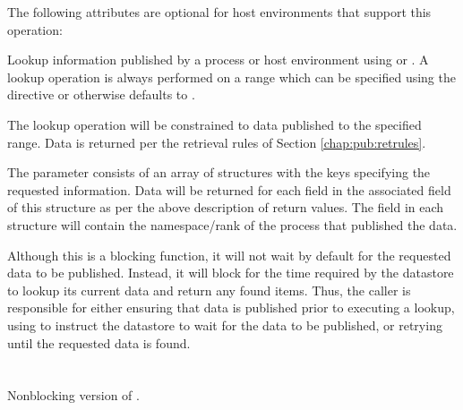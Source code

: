 \reqattrend

\optattrstart
The following attributes are optional for host environments that support this operation:


\optattrend

\descr

Lookup information published by a process or host environment using  or .
A lookup operation is always performed on a range which can be specified using the directive  or otherwise defaults to .

The lookup operation will be constrained to data published to the specified range.
Data is returned per the retrieval rules of Section \ref{chap:pub:retrules}.

The  parameter consists of an array of  structures with the keys specifying the requested information.
Data will be returned for each  field in the associated  field of this structure as per the above description of return values. The  field in each  structure will contain the namespace/rank of the process that published the data.

\adviceuserstart
Although this is a blocking function, it will not wait by default for the requested data to be published.
Instead, it will block for the time required by the datastore to lookup its current data and return any found items.
Thus, the caller is responsible for either ensuring that data is published prior to executing a lookup, using  to instruct the datastore to wait for the data to be published, or retrying until the requested data is found.
\adviceuserend


\section{}

\summary

Nonblocking version of .

\format


